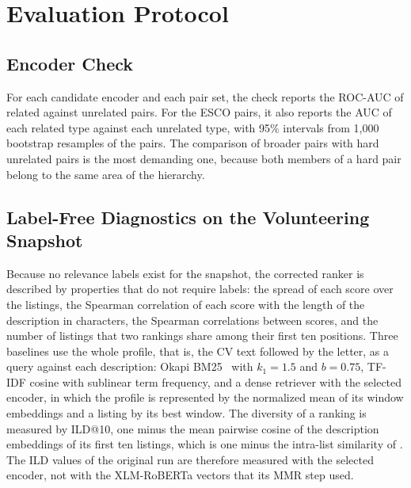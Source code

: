 \documentclass[CHICAGO]{USG}
\begin{document}
\section{Evaluation Protocol}
\label{sec:protocol}

\subsection{Encoder Check}
\label{sec:encodercheck}
For each candidate encoder and each pair set, the check reports the ROC-AUC of related against unrelated pairs. For the ESCO pairs, it also reports the AUC of each related type against each unrelated type, with 95\% intervals from 1{,}000 bootstrap resamples of the pairs. %
The comparison of broader pairs with hard unrelated pairs is the most demanding one, because both members of a hard pair belong to the same area of the hierarchy.

\subsection{Label-Free Diagnostics on the Volunteering Snapshot}
\label{sec:labelfree}
Because no relevance labels exist for the snapshot, the corrected ranker is described by properties that do not require labels: the spread of each score over the listings, the Spearman correlation of each score with the length of the description in characters, the Spearman correlations between scores, and the number of listings that two rankings share among their first ten positions. %
Three baselines use the whole profile, that is, the CV text followed by the letter, as a query against each description: Okapi BM25~\citep{robertson2009} with $k_1=1.5$ and $b=0.75$, TF-IDF cosine with sublinear term frequency, and a dense retriever with the selected encoder, in which the profile is represented by the normalized mean of its window embeddings and a listing by its best window. %
The diversity of a ranking is measured by ILD@10, one minus the mean pairwise cosine of the description embeddings of its first ten listings, which is one minus the intra-list similarity of \citet{ziegler2005}. %
The ILD values of the original run are therefore measured with the selected encoder, not with the XLM-RoBERTa vectors that its MMR step used.
\end{document}
